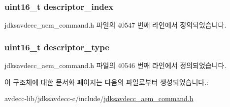 \subsubsection[{\texorpdfstring{descriptor\+\_\+index}{descriptor_index}}]{\setlength{\rightskip}{0pt plus 5cm}uint16\+\_\+t descriptor\+\_\+index}\hypertarget{structjdksavdecc__aem__command__deauthenticate_a042bbc76d835b82d27c1932431ee38d4}{}\label{structjdksavdecc__aem__command__deauthenticate_a042bbc76d835b82d27c1932431ee38d4}


jdksavdecc\+\_\+aem\+\_\+command.\+h 파일의 40547 번째 라인에서 정의되었습니다.

\subsubsection[{\texorpdfstring{descriptor\+\_\+type}{descriptor_type}}]{\setlength{\rightskip}{0pt plus 5cm}uint16\+\_\+t descriptor\+\_\+type}\hypertarget{structjdksavdecc__aem__command__deauthenticate_ab7c32b6c7131c13d4ea3b7ee2f09b78d}{}\label{structjdksavdecc__aem__command__deauthenticate_ab7c32b6c7131c13d4ea3b7ee2f09b78d}


jdksavdecc\+\_\+aem\+\_\+command.\+h 파일의 40546 번째 라인에서 정의되었습니다.



이 구조체에 대한 문서화 페이지는 다음의 파일로부터 생성되었습니다.\+:\begin{DoxyCompactItemize}
\item 
avdecc-\/lib/jdksavdecc-\/c/include/\hyperlink{jdksavdecc__aem__command_8h}{jdksavdecc\+\_\+aem\+\_\+command.\+h}\end{DoxyCompactItemize}
